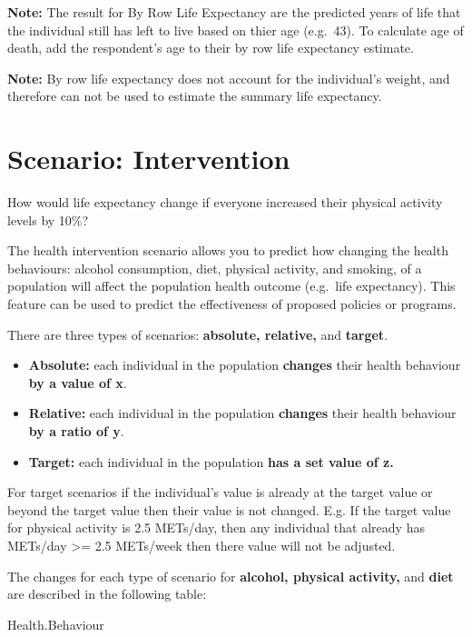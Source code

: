 \documentclass[]{book}
\providecommand{\tightlist}{%
  \setlength{\itemsep}{0pt}\setlength{\parskip}{0pt}}
\begin{document}
\textbf{Note:} The result for By Row Life Expectancy are the predicted years of life that the individual still has left to live based on thier age (e.g.~43). To calculate age of death, add the respondent's age to their by row life expectancy estimate.

\textbf{Note:} By row life expectancy does not account for the individual's weight, and therefore can not be used to estimate the summary life expectancy.

\hypertarget{scenario-intervention}{%
\section{Scenario: Intervention}\label{scenario-intervention}}

How would life expectancy change if everyone increased their physical activity levels by 10\%?

The health intervention scenario allows you to predict how changing the health behaviours: alcohol consumption, diet, physical activity, and smoking, of a population will affect the population health outcome (e.g.~life expectancy). This feature can be used to predict the effectiveness of proposed policies or programs.

There are three types of scenarios: \textbf{absolute, relative,} and \textbf{target}.

\begin{itemize}
\tightlist
\item
  \textbf{Absolute:} each individual in the population \textbf{changes} their health behaviour \textbf{by a value of x}.
\item
  \textbf{Relative:} each individual in the population \textbf{changes} their health behaviour \textbf{by a ratio of y}.
\item
  \textbf{Target:} each individual in the population \textbf{has a set value of z.}
\end{itemize}

For target scenarios if the individual's value is already at the target value or beyond the target value then their value is not changed. E.g. If the target value for physical activity is 2.5 METs/day, then any individual that already has METs/day \textgreater{}= 2.5 METs/week then there value will not be adjusted.

The changes for each type of scenario for \textbf{alcohol, physical activity,} and \textbf{diet} are described in the following table:

Health.Behaviour
\end{document}
